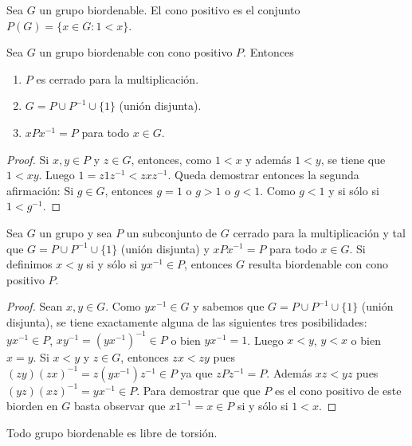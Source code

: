 \begin{definition}
	Sea $G$ un grupo biordenable. El cono positivo es el conjunto $P(G)=\{x\in
	G:1<x\}$.
\end{definition}

\begin{lemma}
	\label{lemma:biordenableP1}
	Sea $G$ un grupo biordenable con cono positivo $P$. Entonces
	\begin{enumerate}
		\item $P$ es cerrado para la multiplicación.
		\item $G=P\cup P^{-1}\cup \{1\}$ (unión disjunta).
		\item $xPx^{-1}=P$ para todo $x\in G$.
	\end{enumerate}
\end{lemma}

\begin{proof}
	Si $x,y\in P$ y $z\in G$, entonces, como $1<x$ y además $1<y$, se tiene que
	$1<xy$.  Luego $1=z1z^{-1}<zxz^{-1}$. Queda demostrar entonces la segunda
	afirmación: Si $g\in G$, entonces $g=1$ o $g>1$ o $g<1$. Como $g<1$ y si
	sólo si $1<g^{-1}$. 
\end{proof}

\begin{lemma}
	\label{lem:biordenableP2}
	Sea $G$ un grupo y sea $P$ un subconjunto de $G$ cerrado para la
	multiplicación y tal que $G=P\cup P^{-1}\cup \{1\}$ (unión disjunta) y
	$xPx^{-1}=P$ para todo $x\in G$. Si definimos $x<y$ si y sólo si
	$yx^{-1}\in P$, entonces $G$ resulta biordenable con cono positivo $P$.
\end{lemma}

\begin{proof}
	Sean $x,y\in G$. Como $yx^{-1}\in G$ y sabemos que $G=P\cup
	P^{-1}\cup\{1\}$ (unión disjunta), se tiene exactamente alguna de las
	siguientes tres posibilidades: $yx^{-1}\in P$, $xy^{-1}=(yx^{-1})^{-1}\in
	P$ o bien $yx^{-1}=1$. Luego $x<y$, $y<x$ o bien $x=y$. Si $x<y$ y $z\in
	G$, entonces $zx<zy$ pues $(zy)(zx)^{-1}=z(yx^{-1})z^{-1}\in P$ ya que
	$zPz^{-1}=P$. Además $xz<yz$ pues $(yz)(xz)^{-1}=yx^{-1}\in P$. Para demostrar que 
	que $P$ es el cono positivo de este biorden en $G$ basta observar que
	$x1^{-1}=x\in P$ si y sólo si $1<x$. 
\end{proof}

\begin{proposition}
	\label{pro:BOsintorsion}
	Todo grupo biordenable es libre de torsión.
\end{proposition}

